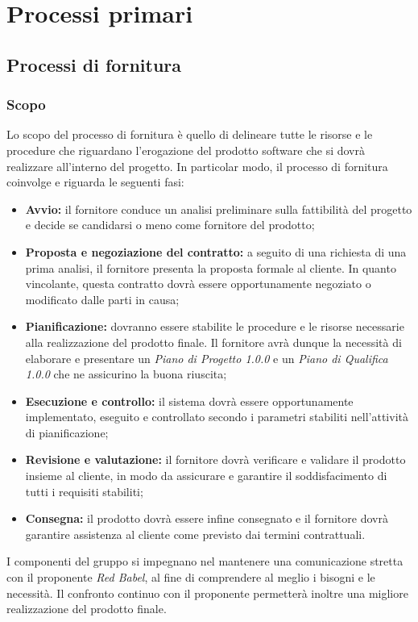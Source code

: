 \section{Processi primari}
\subsection{Processi di fornitura}
\subsubsection{Scopo}
Lo scopo del processo di fornitura è quello di delineare tutte le risorse e le procedure che riguardano l'erogazione del prodotto software che si dovrà realizzare all'interno del progetto. In particolar modo, il processo di fornitura coinvolge e riguarda le seguenti fasi:
\begin{itemize}
	\item \textbf{Avvio:} il fornitore conduce un analisi preliminare sulla fattibilità del progetto e decide se candidarsi o meno come fornitore del prodotto;
	\item \textbf{Proposta e negoziazione del contratto:} a seguito di una richiesta di una prima analisi, il fornitore presenta la proposta formale al cliente. In quanto vincolante, questa contratto dovrà essere opportunamente negoziato o modificato dalle parti in causa;
	\item \textbf{Pianificazione:} dovranno essere stabilite le procedure e le risorse necessarie alla realizzazione del prodotto finale. Il fornitore avrà dunque la necessità di elaborare e presentare un \textit{Piano di Progetto 1.0.0\doc} e un \textit{Piano di Qualifica 1.0.0\doc} che ne assicurino la buona riuscita;
	\item \textbf{Esecuzione e controllo:} il sistema dovrà essere opportunamente implementato, eseguito e controllato secondo i parametri stabiliti nell'attività di pianificazione;
	\item \textbf{Revisione e valutazione:} il fornitore dovrà verificare e validare il prodotto insieme al cliente, in modo da assicurare e garantire il soddisfacimento di tutti i requisiti stabiliti;
	\item \textbf{Consegna:} il prodotto dovrà essere infine consegnato e il fornitore dovrà garantire assistenza al cliente come previsto dai termini contrattuali.
\end{itemize} 
I componenti del gruppo si impegnano nel mantenere una comunicazione stretta con il proponente \textit{Red Babel}, al fine di comprendere al meglio i bisogni e le necessità. Il confronto continuo con il proponente permetterà inoltre una migliore realizzazione del prodotto finale.


